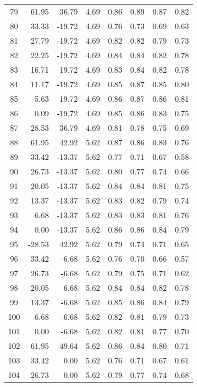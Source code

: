 \begin{center}
\begin{longtable}{crrccccc}
79 & 61.95 & 36.79 &  4.69 &  0.86 &  0.89 &  0.87 &  0.82\\
80 & 33.33 & -19.72 &  4.69 &  0.76 &  0.73 &  0.69 &  0.63\\
81 & 27.79 & -19.72 &  4.69 &  0.82 &  0.82 &  0.79 &  0.73\\
82 & 22.25 & -19.72 &  4.69 &  0.84 &  0.84 &  0.82 &  0.78\\
83 & 16.71 & -19.72 &  4.69 &  0.83 &  0.84 &  0.82 &  0.78\\
84 & 11.17 & -19.72 &  4.69 &  0.85 &  0.87 &  0.85 &  0.80\\
85 &  5.63 & -19.72 &  4.69 &  0.86 &  0.87 &  0.86 &  0.81\\
86 &  0.09 & -19.72 &  4.69 &  0.85 &  0.86 &  0.83 &  0.75\\
87 & -28.53 & 36.79 &  4.69 &  0.81 &  0.78 &  0.75 &  0.69\\
88 & 61.95 & 42.92 &  5.62 &  0.87 &  0.86 &  0.83 &  0.76\\
89 & 33.42 & -13.37 &  5.62 &  0.77 &  0.71 &  0.67 &  0.58\\
90 & 26.73 & -13.37 &  5.62 &  0.80 &  0.77 &  0.74 &  0.66\\
91 & 20.05 & -13.37 &  5.62 &  0.84 &  0.84 &  0.81 &  0.75\\
92 & 13.37 & -13.37 &  5.62 &  0.83 &  0.82 &  0.79 &  0.74\\
93 &  6.68 & -13.37 &  5.62 &  0.83 &  0.83 &  0.81 &  0.76\\
94 &  0.00 & -13.37 &  5.62 &  0.86 &  0.86 &  0.84 &  0.79\\
95 & -28.53 & 42.92 &  5.62 &  0.79 &  0.74 &  0.71 &  0.65\\
96 & 33.42 & -6.68 &  5.62 &  0.76 &  0.70 &  0.66 &  0.57\\
97 & 26.73 & -6.68 &  5.62 &  0.79 &  0.75 &  0.71 &  0.62\\
98 & 20.05 & -6.68 &  5.62 &  0.84 &  0.84 &  0.82 &  0.78\\
99 & 13.37 & -6.68 &  5.62 &  0.85 &  0.86 &  0.84 &  0.79\\
100 &  6.68 & -6.68 &  5.62 &  0.82 &  0.81 &  0.79 &  0.73\\
101 &  0.00 & -6.68 &  5.62 &  0.82 &  0.81 &  0.77 &  0.70\\
102 & 61.95 & 49.64 &  5.62 &  0.86 &  0.84 &  0.80 &  0.71\\
103 & 33.42 &  0.00 &  5.62 &  0.76 &  0.71 &  0.67 &  0.61\\
104 & 26.73 &  0.00 &  5.62 &  0.79 &  0.77 &  0.74 &  0.68\\

\end{longtable}
\end{center}
